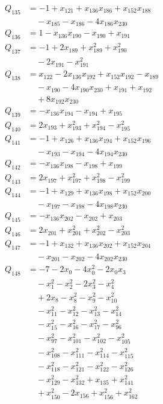 \begin{align*}
Q_{135}&=-1+x_{121}+x_{136}x_{186}+x_{152}x_{188}\\
&\quad -x_{185}-x_{186}-4x_{186}x_{230}\\
Q_{136}&=1-x_{136}x_{190}-x_{190}+x_{191}\\
Q_{137}&=-1+2x_{189}+x_{189}^{2}+x_{190}^{2}\\
&\quad -2x_{191}-x_{191}^{2}\\
Q_{138}&=x_{122}-2x_{136}x_{192}+x_{152}x_{192}-x_{189}\\
&\quad -x_{190}-4x_{190}x_{230}+x_{191}+x_{192}\\
&\quad +8x_{192}x_{230}\\
Q_{139}&=-x_{136}x_{194}-x_{194}+x_{195}\\
Q_{140}&=2x_{193}+x_{193}^{2}+x_{194}^{2}-x_{195}^{2}\\
Q_{141}&=-1+x_{126}+x_{136}x_{194}+x_{152}x_{196}\\
&\quad -x_{193}-x_{194}-4x_{194}x_{230}\\
Q_{142}&=-x_{136}x_{198}-x_{198}+x_{199}\\
Q_{143}&=2x_{197}+x_{197}^{2}+x_{198}^{2}-x_{199}^{2}\\
Q_{144}&=-1+x_{129}+x_{136}x_{198}+x_{152}x_{200}\\
&\quad -x_{197}-x_{198}-4x_{198}x_{230}\\
Q_{145}&=-x_{136}x_{202}-x_{202}+x_{203}\\
Q_{146}&=2x_{201}+x_{201}^{2}+x_{202}^{2}-x_{203}^{2}\\
Q_{147}&=-1+x_{132}+x_{136}x_{202}+x_{152}x_{204}\\
&\quad -x_{201}-x_{202}-4x_{202}x_{230}\\
Q_{148}&=-7-2x_{0}-4x_{0}^{2}-2x_{0}x_{3}\\
&\quad -x_{1}^{2}-x_{2}^{2}-2x_{3}^{2}-x_{4}^{2}\\
&\quad +2x_{8}-x_{8}^{2}-x_{9}^{2}-x_{10}^{2}\\
&\quad -x_{11}^{2}-x_{12}^{2}-x_{13}^{2}-x_{14}^{2}\\
&\quad -x_{15}^{2}-x_{16}^{2}-x_{17}^{2}-x_{96}^{2}\\
&\quad -x_{97}^{2}-x_{101}^{2}-x_{102}^{2}-x_{105}^{2}\\
&\quad -x_{108}^{2}-x_{111}^{2}-x_{114}^{2}-x_{115}^{2}\\
&\quad -x_{118}^{2}-x_{121}^{2}-x_{122}^{2}-x_{126}^{2}\\
&\quad -x_{129}^{2}-x_{132}^{2}+x_{135}+x_{141}^{2}\\
&\quad +x_{150}^{2}-2x_{156}+x_{156}^{2}+x_{162}^{2}\\

\end{align*}
